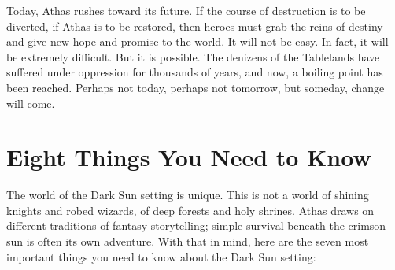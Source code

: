 Today, Athas rushes toward its future. If the course of destruction is to be diverted, if Athas is to be restored,
then heroes must grab the reins of destiny and give new hope and promise to the world. It will not be easy. In fact, it will
be extremely difficult. But it is possible. The denizens of the Tablelands have suffered under oppression for thousands of
years, and now, a boiling point has been reached. Perhaps not today, perhaps not tomorrow, but someday, change will
come.

\section{Eight Things You Need to Know}

The world of the Dark Sun setting is unique. This is not a world of shining knights and robed wizards,
of deep forests and holy shrines. Athas draws on different traditions of fantasy storytelling; simple
survival beneath the crimson sun is often its own adventure. With that in mind, here are the seven most
important things you need to know about the Dark Sun setting:

